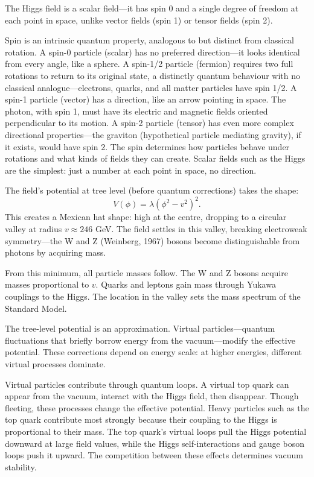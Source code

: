 The Higgs field is a scalar field—it has spin 0 and a single degree of freedom at each point in space, unlike vector fields (spin 1) or tensor fields (spin 2).

Spin is an intrinsic quantum property, analogous to but distinct from classical rotation. A spin-0 particle (scalar) has no preferred direction—it looks identical from every angle, like a sphere. A spin-1/2 particle (fermion) requires two full rotations to return to its original state, a distinctly quantum behaviour with no classical analogue—electrons, quarks, and all matter particles have spin 1/2. A spin-1 particle (vector) has a direction, like an arrow pointing in space. The photon, with spin 1, must have its electric and magnetic fields oriented perpendicular to its motion. A spin-2 particle (tensor) has even more complex directional properties—the graviton (hypothetical particle mediating gravity), if it exists, would have spin 2. The spin determines how particles behave under rotations and what kinds of fields they can create. Scalar fields such as the Higgs are the simplest: just a number at each point in space, no direction.

The field's potential at tree level (before quantum corrections) takes the shape:
\[
V(\phi) = \lambda(\phi^2 - v^2)^2.
\]
This creates a \QSOpen{}Mexican hat\QSClose{} shape: high at the centre, dropping to a circular valley at radius $v \approx 246$ GeV. The field settles in this valley, breaking electroweak symmetry—the W and Z (Weinberg, 1967) bosons become distinguishable from photons by acquiring mass.

From this minimum, all particle masses follow. The W and Z bosons acquire masses proportional to $v$. Quarks and leptons gain mass through Yukawa couplings to the Higgs. The location in the valley sets the mass spectrum of the Standard Model.

The tree-level potential is an approximation. Virtual particles—quantum fluctuations that briefly borrow energy from the vacuum—modify the effective potential. These corrections depend on energy scale: at higher energies, different virtual processes dominate.

Virtual particles contribute through quantum loops. A virtual top quark can appear from the vacuum, interact with the Higgs field, then disappear. Though fleeting, these processes change the effective potential. Heavy particles such as the top quark contribute most strongly because their coupling to the Higgs is proportional to their mass. The top quark's virtual loops pull the Higgs potential downward at large field values, while the Higgs self-interactions and gauge boson loops push it upward. The competition between these effects determines vacuum stability.

